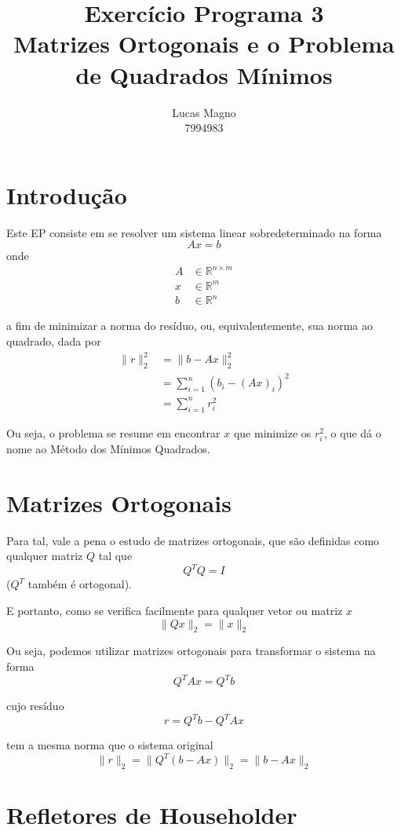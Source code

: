 \documentclass[a4paper,11pt]{article}
\date{}
\author{Lucas Magno \\ 7994983}
\title{Exercício Programa 3 \\ Matrizes Ortogonais e o Problema de Quadrados Mínimos}
\begin{document}
    \maketitle

    \section*{Introdução}
    Este EP consiste em se resolver um sistema linear sobredeterminado na forma
    $$ Ax = b $$
    onde
    \begin{align*}
        A & \in \mathbb{R}^{n\times m}\\
        x & \in \mathbb{R}^{m} \\
        b & \in \mathbb{R}^{n}
    \end{align*}

    a fim de minimizar a norma do resíduo, ou, equivalentemente, sua norma ao quadrado, dada por
    \begin{align*}
        \| r \|_2^2 &= \| b - Ax \|_2^2 \\
                             &= \sum_{i = 1}^n (b_i - (Ax)_i)^2 \\
                             &= \sum_{i = 1}^n r_i^2
    \end{align*}

    Ou seja, o problema se resume em encontrar $x$ que minimize os $r_i^2$, o que dá o nome ao Método dos Mínimos Quadrados.

    \section*{Matrizes Ortogonais}
    Para tal, vale a pena o estudo de matrizes ortogonais, que são definidas como qualquer matriz $Q$ tal que
    $$ Q^TQ = I$$
    ($Q^T$ também é ortogonal).

    E portanto, como se verifica facilmente para qualquer vetor ou matriz $x$
    $$ \| Qx \|_2 = \| x \|_2$$

    Ou seja, podemos utilizar matrizes ortogonais para transformar o sistema na forma
    $$ Q^TAx = Q^Tb$$

    cujo resíduo
    $$ r = Q^Tb - Q^TAx$$

    tem a mesma norma que o sistema original
    $$ \|r\|_2 = \|Q^T(b - Ax)\|_2 = \|b - Ax\|_2$$

    \newpage
    \section*{Refletores de Householder}
\end{document}
